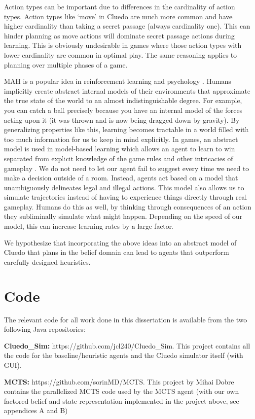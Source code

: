 \documentclass[msc, ai, twoside, notimes, logo, parskip, leftchapter, normalheadings]{infthesis}
\begin{document}
Action types can be important due to differences in the cardinality of action types. Action types like `move' in Cluedo are much more common and have higher cardinality than taking a secret passage (always cardinality one). This can hinder planning as move actions will dominate secret passage actions during learning. This is obviously undesirable in games where those action types with lower cardinality are common in optimal play. The same reasoning applies to planning over multiple phases of a game.

MAH is a popular idea in reinforcement learning and psychology \citep{Sutton-barto} \citep{Mihai}. Humans implicitly create abstract internal models of their environments that approximate the true state of the world to an almost indistinguishable degree. For example, you can catch a ball precisely because you have an internal model of the forces acting upon it (it was thrown and is now being dragged down by gravity). By generalizing properties like this, learning becomes tractable in a world filled with too much information for us to keep in mind explicitly. In games, an abstract model is used in model-based learning which allows an agent to learn to win separated from explicit knowledge of the game rules and other intricacies of gameplay \citep{Sutton-barto}. We do not need to let our agent fail to suggest every time we need to make a decision outside of a room. Instead, agents act based on a model that unambiguously delineates legal and illegal actions. This model also allows us to simulate trajectories instead of having to experience things directly through real gameplay. Humans do this as well, by thinking through consequences of an action they subliminally simulate what might happen. Depending on the speed of our model, this can increase learning rates by a large factor. 

We hypothesize that incorporating the above ideas into an abstract model of Cluedo that plans in the belief domain can lead to agents that outperform carefully designed heuristics.

\section{Code}
The relevant code for all work done in this dissertation is available from the two following Java repositories:
\begin{description}
\item \textbf{Cluedo\_Sim:} https://github.com/jcl240/Cluedo\_Sim. This project contains all the code for the baseline/heuristic agents and the Cluedo simulator itself (with GUI). 
\item \textbf{MCTS:} https://github.com/sorinMD/MCTS. This project by Mihai Dobre contains the parallelized MCTS code used by the MCTS agent (with our own factored belief and state representation implemented in the project above, see appendices A and B)
\end{description}
\end{document}
